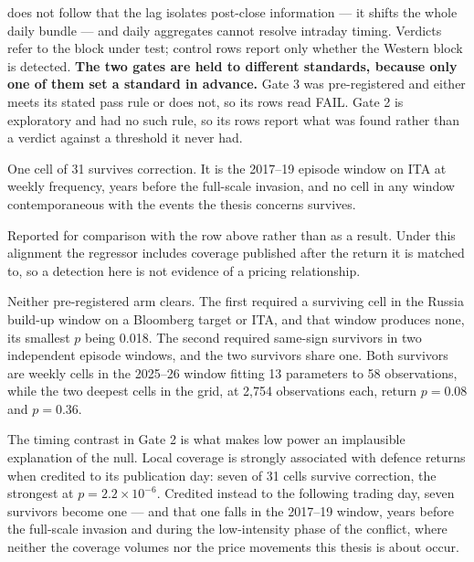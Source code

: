 \documentclass[12pt,a4paper]{article}
\begin{document}
\begin{table}[H]
\begin{threeparttable}
\begin{tablenotes}
does not follow that the lag isolates post-close information --- it shifts the
whole daily bundle --- and daily aggregates cannot resolve intraday timing.
Verdicts refer to the block under test; control rows report only whether the
Western block is detected. \textbf{The two gates are held to different
standards, because only one of them set a standard in advance.} Gate 3 was
pre-registered and either meets its stated pass rule or does not, so its rows
read FAIL. Gate 2 is exploratory and had no such rule, so its rows report what
was found rather than a verdict against a threshold it never had.
\item[$a$] One cell of 31 survives correction. It is the 2017--19 episode window
on ITA at weekly frequency, years before the full-scale invasion, and no cell in
any window contemporaneous with the events the thesis concerns survives.
\item[$b$] Reported for comparison with the row above rather than as a result.
Under this alignment the regressor includes coverage published after the return
it is matched to, so a detection here is not evidence of a pricing relationship.
\item[$c$] Neither pre-registered arm clears. The first required a surviving
cell in the Russia build-up window on a Bloomberg target or ITA, and that window
produces none, its smallest $p$ being 0.018. The second required same-sign
survivors in two independent episode windows, and the two survivors share one.
Both survivors are weekly cells in the 2025--26 window fitting 13 parameters to
58 observations, while the two deepest cells in the grid, at 2,754 observations
each, return $p = 0.08$ and $p = 0.36$.
\end{tablenotes}
\end{threeparttable}
\end{table}

The timing contrast in Gate 2 is what makes low power an implausible explanation of the null. Local coverage is strongly associated with defence returns when credited to its publication day: seven of 31 cells survive correction, the strongest at $p = 2.2\times10^{-6}$. Credited instead to the following trading day, seven survivors become one --- and that one falls in the 2017--19 window, years before the full-scale invasion and during the low-intensity phase of the conflict, where neither the coverage volumes nor the price movements this thesis is about occur.
\end{document}
